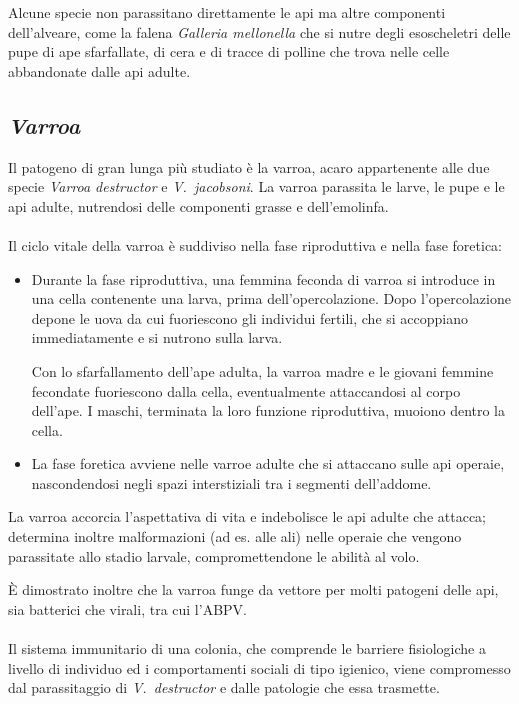 Alcune specie non parassitano direttamente le api ma altre componenti dell'alveare, come la falena \emph{Galleria mellonella} che si nutre degli esoscheletri delle pupe di ape sfarfallate, di cera e di tracce di polline che trova nelle celle abbandonate dalle api adulte.

\subsection{\emph{Varroa}}
Il patogeno di gran lunga più studiato è la varroa, acaro appartenente alle due specie \emph{Varroa destructor} e \emph{V.~jacobsoni}. La varroa parassita le larve, le pupe e le api adulte, nutrendosi delle componenti grasse e dell'emolinfa.

\paragraph{}
Il ciclo vitale della varroa è suddiviso nella fase riproduttiva e nella fase foretica:
\begin{itemize}
    \item Durante la fase riproduttiva, una femmina feconda di varroa si introduce in una cella contenente una larva, prima dell'opercolazione. Dopo l'opercolazione depone le uova da cui fuoriescono gli individui fertili, che si accoppiano immediatamente e si nutrono sulla larva.

    Con lo sfarfallamento dell'ape adulta, la varroa madre e le giovani femmine fecondate fuoriescono dalla cella, eventualmente attaccandosi al corpo dell'ape.
    I maschi, terminata la loro funzione riproduttiva, muoiono dentro la cella.
    \item La fase foretica avviene nelle varroe adulte che si attaccano sulle api operaie, nascondendosi negli spazi interstiziali tra i segmenti dell'addome.
\end{itemize}

La varroa accorcia l'aspettativa di vita e indebolisce le api adulte che attacca; determina inoltre malformazioni (ad es. alle ali) nelle operaie che vengono parassitate allo stadio larvale, compromettendone le abilità al volo.

È dimostrato inoltre che la varroa funge da vettore per molti patogeni delle api, sia batterici che virali, tra cui l'ABPV.

\paragraph{}
Il sistema immunitario di una colonia, che comprende le barriere fisiologiche a livello di individuo ed i comportamenti sociali di tipo igienico, viene compromesso dal parassitaggio di \emph{V.~destructor} e dalle patologie che essa trasmette.


